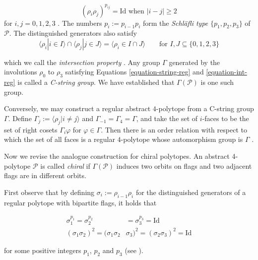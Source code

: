 \documentclass{amsart}
\begin{document}
\begin{equation}
\label{equation-string-reg}
(\rho_i\rho_j)^{p_{ij}}=\text{Id}\text{ when } |i-j|\geq 2
\end{equation}
for $i,j=0,1,2,3$ \cite[Proposition 2B11]{ARP}. The numbers $p_i:=p_{i-1}p_i$
form the \textit{Schläfli type} $\{p_1,p_2,p_3\}$ of $\mathcal{P}$. The
distinguished generators also satisfy 
\begin{equation}
\label{equation-int-reg}
\langle \rho_i|i\in I\rangle\cap\langle\rho_j|j\in J\rangle
=\langle\rho_i\in I\cap J\rangle\qquad\text{for }I,J\subseteq\{0,1,2,3\}
\end{equation}

which we call the \textit{intersection property} \cite[Proposition 2B10]{ARP}.
Any group $\Gamma$ generated by the involutions $\rho_0$ to $\rho_3$ satisfying
Equations \ref{equation-string-reg} and \ref{equation-int-reg} is called a
\textit{C-string group}. We have established that $\Gamma(\mathcal{P})$ is one
such group.

Conversely, we may construct a regular abstract $4$-polytope from a C-string
group $\Gamma$. Define $\Gamma_j:=\langle\rho_j|i\neq j\rangle$ and
$\Gamma_{-1}=\Gamma_4=\Gamma$, and take the set of $i$-faces to be the set of
right cosets $\Gamma_i\varphi$ for $\varphi\in\Gamma$. Then there is an order
relation with respect to which the set of all faces is a regular $4$-polytope
whose automorphism group is $\Gamma$ \cite[Theorem 2E11]{ARP}.

\bigskip\noindent

Now we revise the analogue construction for chiral polytopes. An abstract
4-polytope $\mathcal{P}$ is called \textit{chiral} if $\Gamma(\mathcal{P})$
induces two orbits on flags and two adjacent flags are in different orbits.
	
First observe that by defining $\sigma_i:=\rho_{i-1}\rho_i$ for the
distinguished generators of a regular polytope with bipartite flags, it holds
that

\begin{equation}
\label{equation-chiral-rels}
\begin{aligned}
\sigma_1^{p_1}=\sigma_2^{p_2}&=\sigma_3^{p_3}=\text{Id}\\
(\sigma_1\sigma_2)^2=(\sigma_1\sigma_2&\sigma_3)^2=(\sigma_2\sigma_3)^2=\text{Id}
\end{aligned}
\end{equation}

for some positive integers $p_1$, $p_2$ and $p_3$ (see \cite{egon-asia-chiral}).
	
\end{document}
